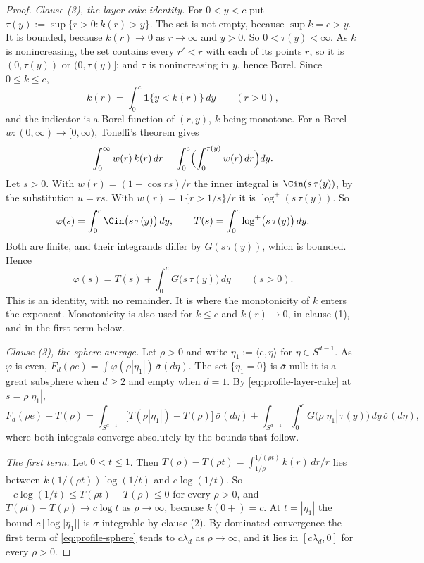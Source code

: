 \begin{proof}
\emph{Clause (3), the layer-cake identity.} For $0 < y < c$ put
$\tau(y) := \sup\{r > 0 : k(r) > y\}$. The set is not empty, because $\sup k = c > y$. It is
bounded, because $k(r) \to 0$ as $r \to \infty$ and $y > 0$. So $0 < \tau(y) < \infty$. As $k$ is
nonincreasing, the set contains every $r' < r$ with each of its points $r$, so it is
$(0,\tau(y))$ or $(0,\tau(y)]$; and $\tau$ is nonincreasing in $y$, hence Borel. Since
$0 \le k \le c$,
\[
  k(r) = \int_0^c \mathbf 1\{y < k(r)\}\,dy \qquad (r > 0),
\]
and the indicator is a Borel function of $(r,y)$, $k$ being monotone. For a Borel
$w : (0,\infty) \to [0,\infty)$, Tonelli's theorem gives
\[
  \int_0^\infty w(r)\,k(r)\,dr = \int_0^c\Bigl(\int_0^{\tau(y)}w(r)\,dr\Bigr)dy .
\]
Let $s > 0$. With $w(r) = (1 - \cos rs)/r$ the inner integral is $\Cin(s\,\tau(y))$, by the
substitution $u = rs$. With $w(r) = \mathbf 1\{r > 1/s\}/r$ it is $\log^+(s\,\tau(y))$. So
\[
  \varphi(s) = \int_0^c \Cin\bigl(s\,\tau(y)\bigr)\,dy, \qquad
  T(s) = \int_0^c \log^+\bigl(s\,\tau(y)\bigr)\,dy .
\]
Both are finite, and their integrands differ by $G(s\,\tau(y))$, which is bounded. Hence
\begin{equation}\label{eq:profile-layer-cake}
  \varphi(s) = T(s) + \int_0^c G\bigl(s\,\tau(y)\bigr)\,dy \qquad (s > 0) .
\end{equation}
This is an identity, with no remainder. It is where the monotonicity of $k$ enters the exponent.
Monotonicity is also used for $k \le c$ and $k(r) \to 0$, in clause (1), and in the first term
below.

\emph{Clause (3), the sphere average.} Let $\rho > 0$ and write
$\eta_1 := \langle e,\eta\rangle$ for $\eta \in S^{d-1}$. As $\varphi$ is even,
$F_d(\rho e) = \int\varphi(\rho|\eta_1|)\,\bar\sigma(d\eta)$. The set $\{\eta_1 = 0\}$ is
$\bar\sigma$-null: it is a great subsphere when $d \ge 2$ and empty when $d = 1$. By
\ref{eq:profile-layer-cake} at $s = \rho|\eta_1|$,
\begin{equation}\label{eq:profile-sphere}
  F_d(\rho e) - T(\rho) = \int_{S^{d-1}}\bigl[T(\rho|\eta_1|) - T(\rho)\bigr]\,\bar\sigma(d\eta)
   + \int_{S^{d-1}}\int_0^c G\bigl(\rho|\eta_1|\,\tau(y)\bigr)\,dy\,\bar\sigma(d\eta) ,
\end{equation}
where both integrals converge absolutely by the bounds that follow.

\emph{The first term.} Let $0 < t \le 1$. Then
$T(\rho) - T(\rho t) = \int_{1/\rho}^{1/(\rho t)}k(r)\,dr/r$ lies between
$k(1/(\rho t))\log(1/t)$ and $c\log(1/t)$. So $-c\log(1/t) \le T(\rho t) - T(\rho) \le 0$ for
every $\rho > 0$, and $T(\rho t) - T(\rho) \to c\log t$ as $\rho \to \infty$, because
$k(0{+}) = c$. At $t = |\eta_1|$ the bound $c\,|\log|\eta_1||$ is $\bar\sigma$-integrable by
clause (2). By dominated convergence the first term of \ref{eq:profile-sphere} tends to
$c\lambda_d$ as $\rho \to \infty$, and it lies in $[c\lambda_d, 0]$ for every $\rho > 0$.


\end{proof}

